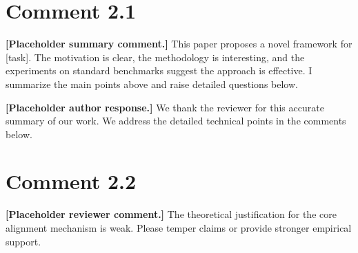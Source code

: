 \section{Comment 2.1}
\begin{reviewercomment}
\textbf{[Placeholder summary comment.]} This paper proposes a novel framework for [task]. The motivation is clear, the methodology is interesting, and the experiments on standard benchmarks suggest the approach is effective. I summarize the main points above and raise detailed questions below.
\end{reviewercomment}

\begin{refsegment}
\begin{authorresponse}
\textbf{[Placeholder author response.]} We thank the reviewer for this accurate summary of our work. We address the detailed technical points in the comments below.
\end{authorresponse}
\RRSectionBibliography
\end{refsegment}

\section{Comment 2.2}
\begin{reviewercomment}
\textbf{[Placeholder reviewer comment.]} The theoretical justification for the core alignment mechanism is weak. Please temper claims or provide stronger empirical support.
\end{reviewercomment}

